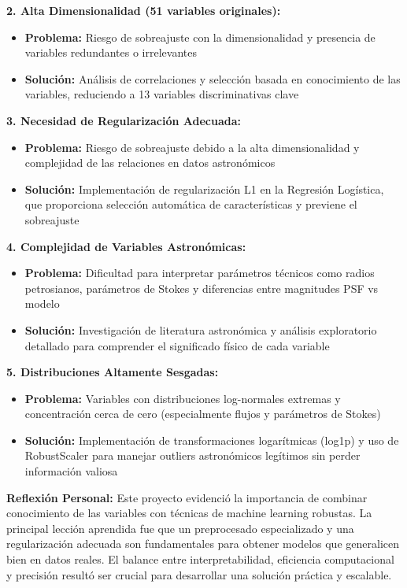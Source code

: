 \documentclass{article}
\begin{document}
\textbf{2. Alta Dimensionalidad (51 variables originales):}
\begin{itemize}
    \item \textbf{Problema:} Riesgo de sobreajuste con la dimensionalidad y presencia de variables redundantes o irrelevantes
    \item \textbf{Solución:} Análisis de correlaciones y selección basada en conocimiento de las variables, reduciendo a 13 variables discriminativas clave
\end{itemize}

\textbf{3. Necesidad de Regularización Adecuada:}
\begin{itemize}
    \item \textbf{Problema:} Riesgo de sobreajuste debido a la alta dimensionalidad y complejidad de las relaciones en datos astronómicos
    \item \textbf{Solución:} Implementación de regularización L1 en la Regresión Logística, que proporciona selección automática de características y previene el sobreajuste
\end{itemize}

\textbf{4. Complejidad de Variables Astronómicas:}
\begin{itemize}
    \item \textbf{Problema:} Dificultad para interpretar parámetros técnicos como radios petrosianos, parámetros de Stokes y diferencias entre magnitudes PSF vs modelo
    \item \textbf{Solución:} Investigación de literatura astronómica y análisis exploratorio detallado para comprender el significado físico de cada variable
\end{itemize}

\textbf{5. Distribuciones Altamente Sesgadas:}
\begin{itemize}
    \item \textbf{Problema:} Variables con distribuciones log-normales extremas y concentración cerca de cero (especialmente flujos y parámetros de Stokes)
    \item \textbf{Solución:} Implementación de transformaciones logarítmicas (log1p) y uso de RobustScaler para manejar outliers astronómicos legítimos sin perder información valiosa
\end{itemize}

\textbf{Reflexión Personal:}
Este proyecto evidenció la importancia de combinar conocimiento de las variables con técnicas de machine learning robustas. La principal lección aprendida fue que un preprocesado especializado y una regularización adecuada son fundamentales para obtener modelos que generalicen bien en datos reales. El balance entre interpretabilidad, eficiencia computacional y precisión resultó ser crucial para desarrollar una solución práctica y escalable.
\end{document}
